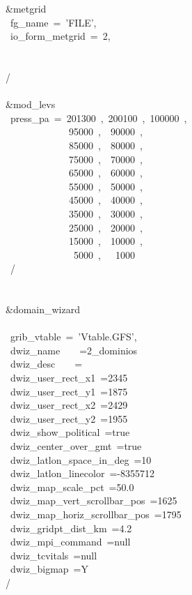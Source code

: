 \&metgrid\\
~fg\_name~=~'FILE',\\
~io\_form\_metgrid~=~2,\\
\\
\\
/\\
\\
\&mod\_levs\\
~press\_pa~=~201300~,~200100~,~100000~,\\
~~~~~~~~~~~~~95000~,~~90000~,\\
~~~~~~~~~~~~~85000~,~~80000~,\\
~~~~~~~~~~~~~75000~,~~70000~,\\
~~~~~~~~~~~~~65000~,~~60000~,\\
~~~~~~~~~~~~~55000~,~~50000~,\\
~~~~~~~~~~~~~45000~,~~40000~,\\
~~~~~~~~~~~~~35000~,~~30000~,\\
~~~~~~~~~~~~~25000~,~~20000~,\\
~~~~~~~~~~~~~15000~,~~10000~,\\
~~~~~~~~~~~~~~5000~,~~~1000\\
~/\\
\\
\\
\&domain\_wizard\\
\\
~grib\_vtable~=~'Vtable.GFS',\\
~dwiz\_name~~~~=2\_dominios\\
~dwiz\_desc~~~~=\\
~dwiz\_user\_rect\_x1~=2345\\
~dwiz\_user\_rect\_y1~=1875\\
~dwiz\_user\_rect\_x2~=2429\\
~dwiz\_user\_rect\_y2~=1955\\
~dwiz\_show\_political~=true\\
~dwiz\_center\_over\_gmt~=true\\
~dwiz\_latlon\_space\_in\_deg~=10\\
~dwiz\_latlon\_linecolor~=-8355712\\
~dwiz\_map\_scale\_pct~=50.0\\
~dwiz\_map\_vert\_scrollbar\_pos~=1625\\
~dwiz\_map\_horiz\_scrollbar\_pos~=1795\\
~dwiz\_gridpt\_dist\_km~=4.2\\
~dwiz\_mpi\_command~=null\\
~dwiz\_tcvitals~=null\\
~dwiz\_bigmap~=Y\\
/\\


